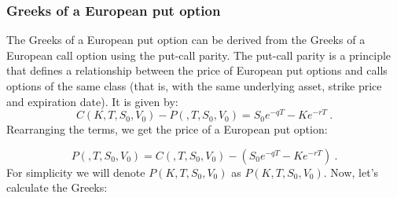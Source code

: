 





\subsubsection{Greeks of a European put option}

The Greeks of a European put option can be derived from the Greeks of a European call option using the put-call parity. The put-call parity is a principle that defines a relationship between the price of European put options and calls options of the same class (that is, with the same underlying asset, strike price and expiration date). It is given by:
$$
C(K, T, S_0, V_0) - P(, T, S_0, V_0)  = S_0 e^{-q T} - K e^{-r T} \ .
$$
Rearranging the terms, we get the price of a European put option:

$$
P(, T, S_0, V_0) = C(, T, S_0, V_0) - \left(S_0 e^{-q T} - K e^{-r T}\right) \ .
$$
For simplicity we will denote $P(K,T, S_0, V_0)$ as $P(K,T,S_0,V_0)$.
Now, let's calculate the Greeks:

